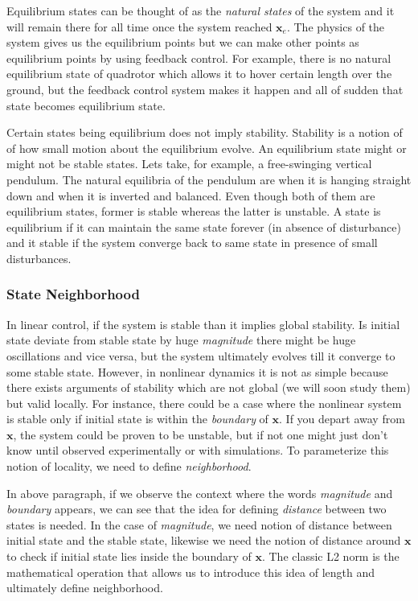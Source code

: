 \documentclass{article}
\begin{document}
Equilibrium states can be thought of as the \textit{natural states} of the system and it will remain there for all time once the system reached $\bm{x}_{e}$. The physics of the system gives us the equilibrium points but we can make other points as equilibrium points by using feedback control. For example, there is no natural equilibrium state of quadrotor which allows it to hover certain length over the ground, but the feedback control system makes it happen and all of sudden that state becomes equilibrium state.

Certain states being equilibrium does not imply stability. Stability is a notion of of how small motion about the equilibrium evolve. An equilibrium state might or might not be stable states. Lets take, for example, a free-swinging vertical pendulum. The natural equilibria of the pendulum are when it is hanging straight down and when it is inverted and balanced. Even though both of them are equilibrium states, former is stable whereas the latter is unstable. A state is equilibrium if it can maintain the same state forever (in absence of disturbance) and it stable if the system converge back to same state in presence of small disturbances.

\subsubsection*{State Neighborhood}
In linear control, if the system is stable than it implies global stability. Is initial state deviate from stable state by huge \textit{magnitude} there might be huge oscillations and vice versa, but the system ultimately evolves till it converge to some stable state. However, in nonlinear dynamics it is not as simple because there exists arguments of stability which are not global (we will soon study them) but valid locally. For instance, there could be a case where the nonlinear system is stable only if initial state is within the \textit{boundary} of $\bm{x}$. If you depart away from $\bm{x}$, the system could be proven to be unstable, but if not one might just don't know until observed experimentally or with simulations. To parameterize this notion of locality, we need to define \textit{neighborhood}.

In above paragraph, if we observe the context where the words \textit{magnitude} and \textit{boundary} appears, we can see that the idea for defining \textit{distance} between two states is needed. In the case of \textit{magnitude}, we need notion of distance between initial state and the stable state, likewise we need the notion of distance around $\bm{x}$ to check if initial state lies inside the boundary of $\bm{x}$. The classic L2 norm is the mathematical operation that allows us to introduce this idea of length and ultimately define neighborhood.
\end{document}
